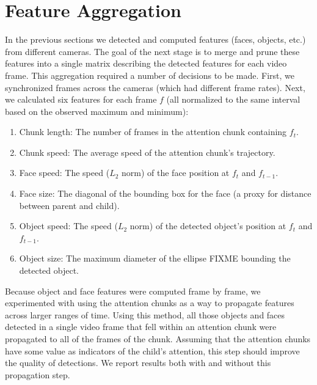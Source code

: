 \documentclass[10pt,letterpaper]{article}
\begin{document}
\section{Feature Aggregation}

In the previous sections we detected and computed features (faces, objects, etc.) from different cameras. The goal of the next stage is to merge and prune these features into a single matrix describing the detected features for each video frame. This aggregation required a number of decisions to be made. First, we synchronized frames across the cameras (which had different frame rates). Next, we calculated six features for each frame $f$ (all normalized to the same interval based on the observed maximum and minimum): 


\begin{enumerate}[noitemsep]
\item Chunk length: The number of frames in the attention chunk containing $f_{t}$.
\item Chunk speed: The average speed of the attention chunk's trajectory. 
\item Face speed: The speed ($L_{2}$ norm) of the face position at $f_t$ and $f_{t-1}$. 
\item Face size: The diagonal of the bounding box for the face (a proxy for distance between parent and child).
\item  Object speed: The speed ($L_{2}$ norm) of the detected object's position at $f_t$ and $f_{t-1}$.    
\item Object size: The maximum diameter of the ellipse FIXME bounding the detected object.
\end{enumerate}

Because object and face features were computed frame by frame, we experimented with using the attention chunks as a way to propagate features across larger ranges of time. Using this method, all those objects and faces detected in a single video frame that fell within an attention chunk were propagated to all of the frames of the chunk. Assuming that the attention chunks have some value as indicators of the child's attention, this step should improve the quality of detections. We report results both with and without this propagation step. 
\end{document}
